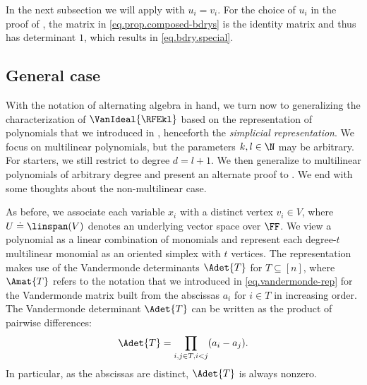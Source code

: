 In the next subsection we will apply  with $u_i=v_i$. For the choice of $u_i$ in the proof of , the matrix in \eqref{eq.prop.composed-bdrys} is the identity matrix and thus has determinant $1$, which results in \eqref{eq.bdry.special}.


\subsection{General case}
\label{s.simplicial-repr.gen-case}

With the notation of alternating algebra in hand,
we turn now to generalizing the characterization of $\VanIdeal{\RFEkl}$ based on the representation of polynomials that we introduced in , henceforth the \emph{simplicial representation}. We focus on multilinear polynomials, but the parameters \(k,l\in\N\) may be arbitrary. For starters, we still restrict to degree $d=l+1$. We then generalize to multilinear polynomials of arbitrary degree and present an alternate proof to . We end with some thoughts about the non-multilinear case. 

As before, we associate each variable \(x_i\) with a distinct vertex \(v_i \in V\), where $U \doteq \linspan(V)$ denotes an underlying vector space over $\FF$. We view a polynomial as a linear combination of monomials and represent each
degree-$t$ multilinear monomial as an oriented simplex with $t$ vertices. The representation makes use of the Vandermonde determinants $\Adet{T}$ for $T \subseteq [n]$, where $\Amat{T}$ refers to the notation that we introduced in \eqref{eq.vandermonde-rep} for the Vandermonde matrix built from the abscissas $a_i$ for $i \in T$ in increasing order. The Vandermonde determinant $\Adet{T}$ can be written as the product of pairwise differences:
\begin{equation}\label{eq.vandermonde-rep.differences}
\Adet{T} = \prod_{i,j \in T, i<j} (a_i-a_j).
\end{equation}
In particular, as the abscissas are distinct, $\Adet{T}$ is always nonzero.

